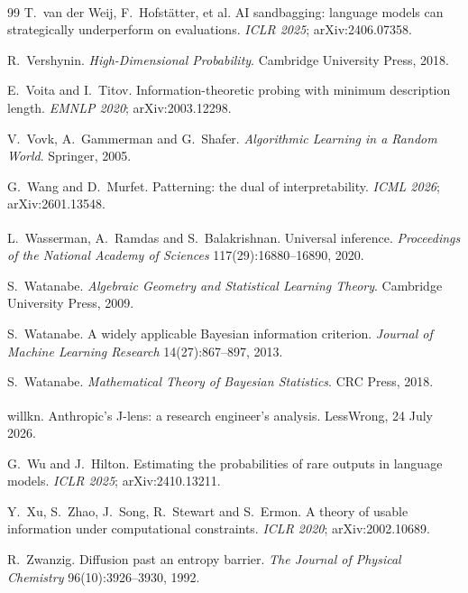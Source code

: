 \documentclass[11pt,a4paper]{article}
\newcommand{\unv}{\textsuperscript{\dag}}
\begin{document}
\begin{thebibliography}{99}
\unv{} T.~van der Weij, F.~Hofst\"atter, et al. AI
sandbagging: language models can strategically underperform on
evaluations. \emph{ICLR 2025}; arXiv:2406.07358.

 R.~Vershynin. \emph{High-Dimensional Probability}.
Cambridge University Press, 2018.

 E.~Voita and I.~Titov. Information-theoretic probing
with minimum description length. \emph{EMNLP 2020}; arXiv:2003.12298.

 V.~Vovk, A.~Gammerman and G.~Shafer. \emph{Algorithmic
Learning in a Random World}. Springer, 2005.

 G.~Wang and D.~Murfet. Patterning: the dual of
interpretability. \emph{ICML 2026}; arXiv:2601.13548.

\unv{} L.~Wasserman, A.~Ramdas and S.~Balakrishnan.
Universal inference. \emph{Proceedings of the National Academy of
Sciences} 117(29):16880--16890, 2020.

 S.~Watanabe. \emph{Algebraic Geometry and
Statistical Learning Theory}. Cambridge University Press, 2009.

 S.~Watanabe. A widely applicable Bayesian information
criterion. \emph{Journal of Machine Learning Research} 14(27):867--897,
2013.

 S.~Watanabe. \emph{Mathematical Theory of Bayesian
Statistics}. CRC Press, 2018.

\unv{} willkn. Anthropic's J-lens: a research
engineer's analysis. LessWrong, 24 July 2026.

 G.~Wu and J.~Hilton. Estimating the probabilities
of rare outputs in language models. \emph{ICLR 2025}; arXiv:2410.13211.

 Y.~Xu, S.~Zhao, J.~Song, R.~Stewart and S.~Ermon. A theory
of usable information under computational constraints. \emph{ICLR 2020};
arXiv:2002.10689.

 R.~Zwanzig. Diffusion past an entropy barrier.
\emph{The Journal of Physical Chemistry} 96(10):3926--3930, 1992.

\end{thebibliography}
\end{document}
